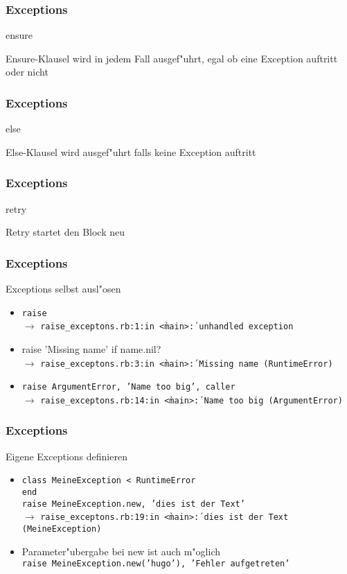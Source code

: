 \documentclass{beamer}
\begin{document}
\begin{frame}
  \frametitle{Exceptions}
  ensure
  
  Ensure-Klausel wird in jedem Fall ausgef"uhrt, egal ob eine Exception auftritt oder nicht
\end{frame}

\begin{frame}
  \frametitle{Exceptions}
  else
  
  Else-Klausel wird ausgef"uhrt falls keine Exception auftritt
\end{frame}

\begin{frame}
  \frametitle{Exceptions}
  retry
  
  Retry startet den Block neu
\end{frame}

\begin{frame}
  \frametitle{Exceptions}
  Exceptions selbst ausl"osen
  \begin{itemize}[<+->]
    \item \texttt{raise} \\
      $\longrightarrow$ \texttt{raise\_exceptons.rb:1:in \`<main>\': unhandled exception}
    \item{raise 'Missing name' if name.nil?} \\
      $\longrightarrow$ \texttt{raise\_exceptons.rb:3:in \`<main>\': Missing name (RuntimeError)}
    \item \texttt{raise ArgumentError, 'Name too big', caller} \\
          $\longrightarrow$ \texttt{raise\_exceptons.rb:14:in \`<main>\': Name too big (ArgumentError)}
  \end{itemize}
\end{frame}

\begin{frame}
  \frametitle{Exceptions}
  Eigene Exceptions definieren 
  \begin{itemize}
    \item \texttt{class MeineException < RuntimeError \\
end \\
raise MeineException.new, 'dies ist der Text'}  \\
\vspace{3ex}$\longrightarrow$ \texttt{raise\_exceptons.rb:19:in \`<main>\': dies ist der Text (MeineException)}
    \pause
    \item Parameter"ubergabe bei new ist auch m"oglich\\
          \texttt{raise MeineException.new('hugo'), 'Fehler aufgetreten'}
  \end{itemize}
\end{frame}
\end{document}
